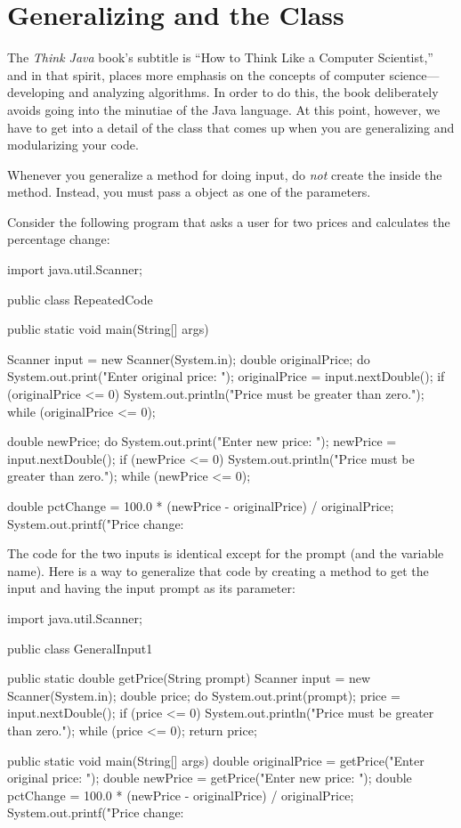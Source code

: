 \section{Generalizing and the  Class}

The {\em Think Java} book's subtitle is ``How to Think Like a Computer Scientist,'' and in that spirit, places more emphasis on the concepts of computer science---developing and analyzing algorithms. In order to do this, the book deliberately avoids going into the minutiae of the Java language. At this point, however, we have to get into a detail of the  class that comes up when you are generalizing and modularizing your code.

Whenever you generalize a method for doing input, do {\em not} create the  inside the method. Instead, you must pass a  object as one of the parameters.

Consider the following program that asks a user for two prices and calculates the percentage change:


\begin{code}
import java.util.Scanner;

public class RepeatedCode {
  public static void main(String[] args) {
    Scanner input = new Scanner(System.in);
    double originalPrice;
    do {
      System.out.print("Enter original price: ");
      originalPrice = input.nextDouble();
      if (originalPrice <= 0) {
        System.out.println("Price must be greater than zero.");
      }
    } while (originalPrice <= 0);
    
    double newPrice;
    do {
      System.out.print("Enter new price: ");
      newPrice = input.nextDouble();
      if (newPrice <= 0) {
        System.out.println("Price must be greater than zero.");
      }
    } while (newPrice <= 0);
    
    double pctChange = 100.0 *
      (newPrice - originalPrice) / originalPrice;
    System.out.printf("Price change: %
  }
}
\end{code}


The code for the two inputs is identical except for the prompt (and the variable name). Here is a way to generalize that code by creating a method to get the input and having the input prompt as its parameter:

\begin{code}
import java.util.Scanner;

public class GeneralInput1 {
  
  public static double getPrice(String prompt) {
    Scanner input = new Scanner(System.in);
    double price;
    do {
      System.out.print(prompt);
      price = input.nextDouble();
      if (price <= 0) {
        System.out.println("Price must be greater than zero.");
      }
    } while (price <= 0);
    return price;
  }

    
  public static void main(String[] args) {
    double originalPrice = getPrice("Enter original price: ");
    double newPrice = getPrice("Enter new price: ");
    double pctChange = 100.0 *
      (newPrice - originalPrice) / originalPrice;
    System.out.printf("Price change: %
  }
}
\end{code}

